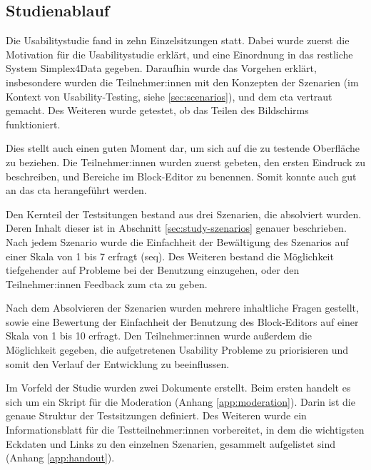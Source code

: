 \subsection{Studienablauf}

Die Usabilitystudie fand in zehn Einzelsitzungen statt. Dabei wurde zuerst die Motivation für die Usabilitystudie erklärt, und eine Einordnung in das restliche System Simplex4Data gegeben. Daraufhin wurde das Vorgehen erklärt, insbesondere wurden die Teilnehmer:innen mit den Konzepten der Szenarien (im Kontext von Usability-Testing, siehe \ref{sec:scenarios}), und dem \ac{cta} vertraut gemacht. Des Weiteren wurde getestet, ob das Teilen des Bildschirms funktioniert.

Dies stellt auch einen guten Moment dar, um sich auf die zu testende Oberfläche zu beziehen. Die Teilnehmer:innen wurden zuerst gebeten, den ersten Eindruck zu beschreiben, und Bereiche im Block-Editor zu benennen. Somit konnte auch gut an das \ac{cta} herangeführt werden.

Den Kernteil der Testsitungen bestand aus drei Szenarien, die absolviert wurden. Deren Inhalt dieser ist in Abschnitt \ref{sec:study-szenarios} genauer beschrieben. Nach jedem Szenario wurde die Einfachheit der Bewältigung des Szenarios auf einer Skala von 1 bis 7 erfragt (\ac{seq}). Des Weiteren bestand die Möglichkeit tiefgehender auf Probleme bei der Benutzung einzugehen, oder den Teilnehmer:innen Feedback zum \ac{cta} zu geben.

Nach dem Absolvieren der Szenarien wurden mehrere inhaltliche Fragen gestellt, sowie eine Bewertung der Einfachheit der Benutzung des Block-Editors auf einer Skala von 1 bis 10 erfragt. Den Teilnehmer:innen wurde außerdem die Möglichkeit gegeben, die aufgetretenen Usability Probleme zu priorisieren und somit den Verlauf der Entwicklung zu beeinflussen.

Im Vorfeld der Studie wurden zwei Dokumente erstellt. Beim ersten handelt es sich um ein Skript für die Moderation (Anhang \ref{app:moderation}). Darin ist die genaue Struktur der Testsitzungen definiert. Des Weiteren wurde ein Informationsblatt für die Testteilnehmer:innen vorbereitet, in dem die wichtigsten Eckdaten und Links zu den einzelnen Szenarien, gesammelt aufgelistet sind (Anhang \ref{app:handout}).
